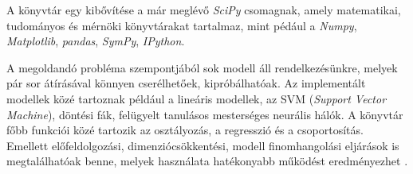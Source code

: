 A könyvtár egy kibővítése a már meglévő \textit{SciPy} csomagnak, amely matematikai, tudományos és mérnöki könyvtárakat tartalmaz, mint pédául a \textit{Numpy}, \textit{Matplotlib}, \textit{pandas}, \textit{SymPy}, \textit{IPython}.

A megoldandó probléma szempontjából sok modell áll rendelkezésünkre, melyek pár sor átírásával könnyen cserélhetőek, kipróbálhatóak. Az implementált modellek közé tartoznak például a lineáris modellek, az SVM (\textit{Support Vector Machine}), döntési fák, felügyelt tanulásos mesterséges neurális hálók.
A könyvtár főbb funkciói közé tartozik az osztályozás, a regresszió és a csoportosítás. Emellett előfeldolgozási, dimenziócsökkentési, modell finomhangolási eljárások is megtalálhatóak benne, melyek használata hatékonyabb működést eredményezhet \cite{pedregosa2011scikit,hackeling2017mastering}.
